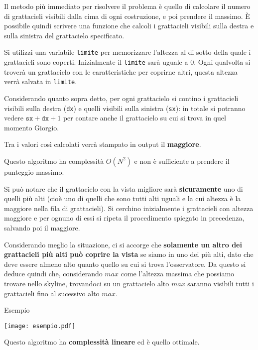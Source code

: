 

\SolNQ
Il metodo più immediato per risolvere il problema è quello di calcolare il numero di grattacieli visibili dalla cima di ogni costruzione, e poi prendere il massimo.\newline
È possibile quindi scrivere una funzione che calcoli i grattacieli visibili sulla destra e sulla sinistra del grattacielo specificato.

Si utilizzi una variabile \texttt{limite} per memorizzare l'altezza al di sotto della quale i grattacieli sono coperti.\newline
Inizialmente il \texttt{limite} sarà uguale a $0$. Ogni qualvolta si troverà un grattacielo con le caratteristiche per coprirne altri, questa altezza verrà salvata in \texttt{limite}.

Considerando quanto sopra detto, per ogni grattacielo si contino i grattacieli visibili sulla destra (\texttt{dx}) e quelli visibili sulla sinistra (\texttt{sx}): in totale si potranno vedere $\texttt{sx} + \texttt{dx} + 1$ per contare anche il grattacielo su cui si trova in quel momento Giorgio.

Tra i valori così calcolati verrà stampato in output il \textbf{maggiore}.

Questo algoritmo ha complessità $O(N^2)$ e non è sufficiente a prendere il punteggio massimo.

\Codice


\SolNQOtt
Si può notare che il grattacielo con la vista migliore sarà \textbf{sicuramente} uno di quelli più alti (cioè uno di quelli che sono tutti alti uguali e la cui altezza è la maggiore nella fila di grattacieli).\newline
Si cerchino inizialmente i grattacieli con altezza maggiore e per ognuno di essi si ripeta il procedimento spiegato in precedenza, salvando poi il maggiore.

\SolLin
Considerando meglio la situazione, ci si accorge che \textbf{solamente un altro dei grattacieli più alti può coprire la vista} se siamo in uno dei più alti, dato che deve essere almeno alto quanto quello su cui si trova l'osservatore.\newline
Da questo si deduce quindi che, considerando $max$ come l'altezza massima che possiamo trovare nello skyline, trovandoci su un grattacielo alto $max$ saranno visibili tutti i grattacieli fino al sucessivo alto $max$.

Esempio

\texttt{[image: esempio.pdf]}

Questo algoritmo ha \textbf{complessità lineare} ed è quello ottimale.

\Codice